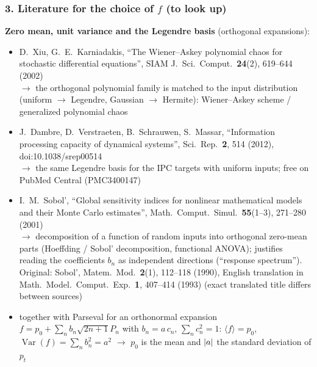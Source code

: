 \subsubsection*{3. Literature for the choice of $f$ (to look up)}
\label{sec:rq2-literature}
\textbf{Zero mean, unit variance and the Legendre basis} (orthogonal expansions):
\begin{itemize}
    \item D.~Xiu, G.~E.~Karniadakis, ``The Wiener--Askey polynomial chaos for stochastic differential equations'',
    SIAM J.\ Sci.\ Comput.\ \textbf{24}(2), 619--644 (2002)\\
    $\to$ the orthogonal polynomial family is matched to the input distribution (uniform $\to$ Legendre,
    Gaussian $\to$ Hermite): Wiener--Askey scheme / generalized polynomial chaos
    \item J.~Dambre, D.~Verstraeten, B.~Schrauwen, S.~Massar, ``Information processing capacity of dynamical
    systems'', Sci.\ Rep.\ \textbf{2}, 514 (2012), doi:10.1038/srep00514\\
    $\to$ the same Legendre basis for the IPC targets with uniform inputs; free on PubMed Central (PMC3400147)
    \item I.~M.~Sobol', ``Global sensitivity indices for nonlinear mathematical models and their Monte Carlo
    estimates'', Math.\ Comput.\ Simul.\ \textbf{55}(1--3), 271--280 (2001)\\
    $\to$ decomposition of a function of random inputs into orthogonal zero-mean parts (Hoeffding / Sobol'
    decomposition, functional ANOVA); justifies reading the coefficients $b_n$ as independent directions
    (``response spectrum''). Original: Sobol', Matem.\ Mod.\ \textbf{2}(1), 112--118 (1990), English translation
    in Math.\ Model.\ Comput.\ Exp.\ \textbf{1}, 407--414 (1993) (exact translated title differs between sources)
    \item together with Parseval for an orthonormal expansion $f = p_0 + \sum_n b_n \sqrt{2n+1} P_n$ with $b_n = a\, c_n$, $\sum_n c_n^2 = 1$:
    $\langle f \rangle = p_0$, $\operatorname{Var}(f) = \sum_n b_n^2 = a^2$ $\to$ $p_0$ is the mean and $\abs{a}$ the standard
    deviation of $p_t$
\end{itemize}

